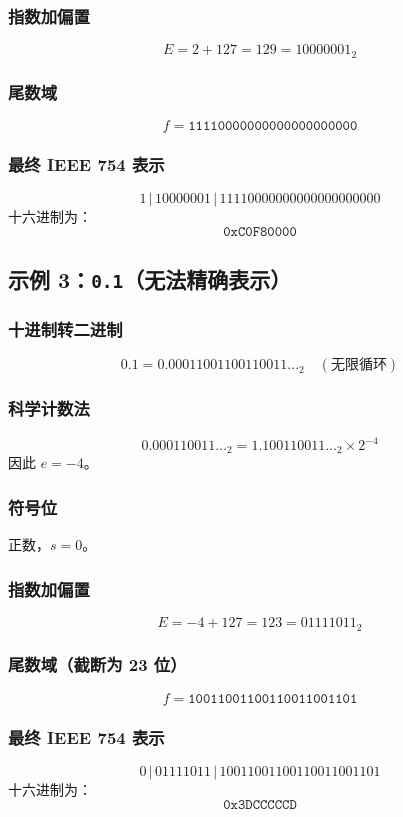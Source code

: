 \subsubsection*{指数加偏置}
\[
E = 2+127 = 129 = 10000001_2
\]

\subsubsection*{尾数域}
\[
f = \texttt{11110000000000000000000}
\]

\subsubsection*{最终 IEEE 754 表示}
\[
1 \,|\, 10000001 \,|\, 11110000000000000000000
\]
十六进制为：
\[
\texttt{0xC0F80000}
\]

\newpage

\subsection{示例 3：\texttt{0.1}（无法精确表示）}

\subsubsection*{十进制转二进制}
\[
0.1 = 0.00011001100110011\ldots_2 \quad (\text{无限循环})
\]

\subsubsection*{科学计数法}
\[
0.000110011\ldots_2 = 1.100110011\ldots_2 \times 2^{-4}
\]
因此 $e=-4$。

\subsubsection*{符号位}
正数，$s=0$。

\subsubsection*{指数加偏置}
\[
E = -4 + 127 = 123 = 01111011_2
\]

\subsubsection*{尾数域（截断为 23 位）}
\[
f = \texttt{10011001100110011001101}
\]

\subsubsection*{最终 IEEE 754 表示}
\[
0 \,|\, 01111011 \,|\, 10011001100110011001101
\]
十六进制为：
\[
\texttt{0x3DCCCCCD}
\]

